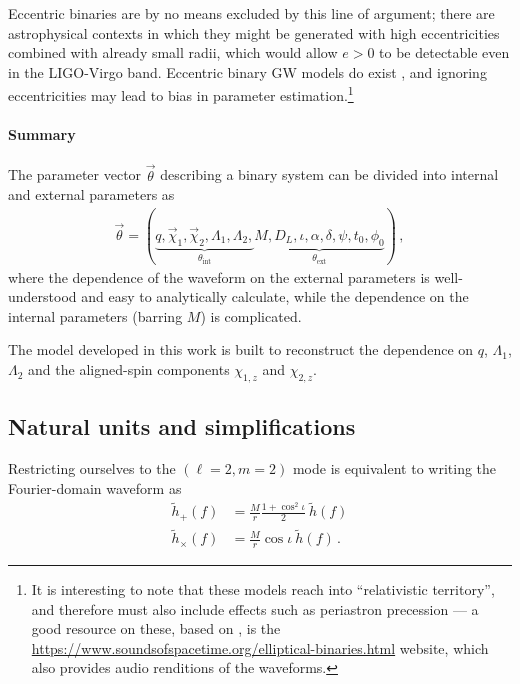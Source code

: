 \documentclass[main.tex]{subfiles}
\begin{document}
Eccentric binaries are by no means excluded by this line of argument; there are astrophysical contexts in which they might be generated with high eccentricities combined with already small radii, which would allow \(e > 0\) to be detectable even in the \ac{LIGO}-Virgo band.
Eccentric binary \ac{GW} models do exist \cite{favataConstrainingOrbitalEccentricity2021}, and ignoring eccentricities may lead to bias in parameter estimation.\footnote{It is interesting to note that these models reach into ``relativistic territory'', and therefore must also include effects such as periastron precession --- a good resource on these, based on \textcite{favataGravitationalwaveMemoryEccentric2011}, is the \href{Sounds of Spacetime}{https://www.soundsofspacetime.org/elliptical-binaries.html} website, which also provides audio renditions of the waveforms.}

\paragraph{Summary}

The parameter vector \(\vec{\theta}\) describing a binary system can be divided into internal and external parameters as 
%
\begin{align}
\vec{\theta} = (\underbrace{q, \vec{\chi}_1, \vec{\chi}_2, \Lambda_1, \Lambda_2,}_{\theta _{\text{int}}} \underbrace{M, D_L, \iota, \alpha, \delta, \psi, t_0, \phi_0 }_{\theta _{\text{ext}}})
\,,
\end{align}
%
where the dependence of the waveform on the external parameters is well-understood and easy to analytically calculate, while the dependence on the internal parameters (barring \(M\)) is complicated.

The model developed in this work is built to reconstruct the dependence on \(q\), \(\Lambda_1\), \(\Lambda_2 \) and the aligned-spin components \(\chi_{1,z} \) and \(\chi_{2, z}\). 

\subsection{Natural units and simplifications} \label{sec:natural-units}

Restricting ourselves to the \((\ell=2, m=2)\) mode is equivalent to writing the Fourier-domain waveform as 
%
\begin{align}
\widetilde{h}_{+}(f) &= \frac{M}{r} \frac{1 + \cos^2 \iota }{2} \ \widetilde{h} (f)  \\
\widetilde{h}_{ \times } (f) &= \frac{M}{r} \cos \iota \ \widetilde{h}(f)
\,.
\end{align}
\end{document}
